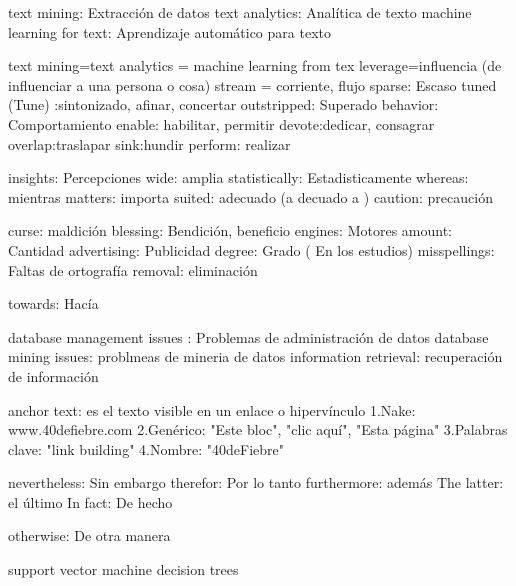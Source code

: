 

text mining: Extracción de datos
text analytics: Analítica de texto
machine learning for text: Aprendizaje automático para texto


text mining=text analytics = machine learning from tex
leverage=influencia (de influenciar a una persona o cosa)
stream = corriente, flujo
sparse: Escaso 
tuned (Tune) :sintonizado, afinar, concertar
outstripped: Superado
behavior: Comportamiento
enable: habilitar, permitir
devote:dedicar, consagrar
overlap:traslapar
sink:hundir
perform: realizar


insights: Percepciones
wide: amplia
statistically: Estadisticamente
whereas: mientras
matters: importa
suited: adecuado (a decuado a )
caution: precaución


curse: maldición
blessing: Bendición, beneficio
engines: Motores
amount: Cantidad
advertising: Publicidad
degree: Grado ( En los estudios)
misspellings: Faltas de ortografía
removal: eliminación


towards: Hacía


database management issues : Problemas de administración de datos
database mining issues: problmeas de mineria de datos
information retrieval: recuperación de información

anchor text: es el texto visible en un enlace o hipervínculo
			1.Nake: www.40defiebre.com
			2.Genérico: "Este bloc", "clic aquí", "Esta página"
			3.Palabras clave: "link building"
			4.Nombre: "40deFiebre"

nevertheless: Sin embargo
therefor: Por lo tanto
furthermore: además
The latter: el último
In fact: De hecho



otherwise: De otra manera





support vector machine
decision trees 
